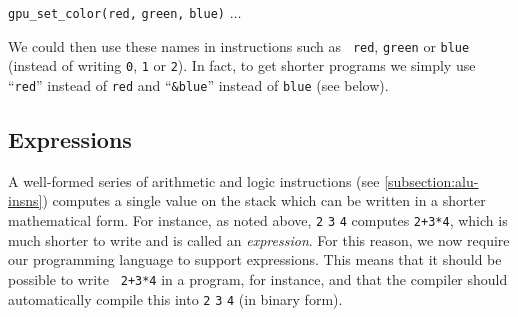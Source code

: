  {\tt gpu\_set\_color}{\tt (}{\tt red,} {\tt green,} {\tt blue}{\tt )}
$\ldots$

\noindent We could then use these names in instructions such as  {\tt
red},  {\tt green} or  {\tt blue} (instead of writing
 {\tt 0},  {\tt 1} or  {\tt 2}). In fact, to get
shorter programs we simply use ``{\tt red}'' instead of  {\tt red}
and ``{\tt \&blue}'' instead of  {\tt blue} (see below).

\subsection{Expressions}\label{subsubsection:toyc5-exprs}

A well-formed series of arithmetic and logic instructions (see
\cref{subsection:alu-insns}) computes a single value on the stack which can be
written in a shorter mathematical form. For instance, as noted above,
 {\tt 2}  {\tt 3}  {\tt 4} 
 computes {\tt 2+3*4}, which is much shorter to write and is called
an {\em expression}. For this reason, we now require our programming language
to support expressions. This means that it should be possible to write {\tt
2+3*4} in a program, for instance, and that the compiler should automatically
compile this into  {\tt 2}  {\tt 3}  {\tt 4}
  (in binary form).

